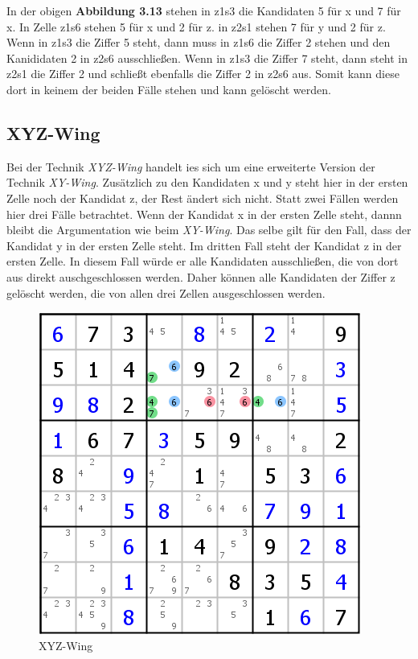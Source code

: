 \documentclass[accentcolor=tud6b,11pt,paper=a4]{tudreport}
\begin{document}
In der obigen \textbf{Abbildung 3.13} stehen in z1s3 die Kandidaten 5 für x und 7 für x. In Zelle z1s6 stehen 5 für x und 2 für z. in z2s1 stehen 7 für y und 2 für z. Wenn in z1s3 die Ziffer 5 steht, dann muss in z1s6 die Ziffer 2 stehen und den Kanididaten 2 in z2s6 ausschließen. Wenn in z1s3 die Ziffer 7 steht, dann steht in z2s1 die Ziffer 2 und schließt ebenfalls die Ziffer 2 in z2s6 aus. Somit kann diese dort in keinem der beiden Fälle stehen und kann gelöscht werden.

\newpage
\subsection{XYZ-Wing}
Bei der Technik \textit{XYZ-Wing} handelt ies sich um eine erweiterte Version der Technik \textit{XY-Wing}. Zusätzlich zu den Kandidaten x und y steht hier in der ersten Zelle noch der Kandidat z, der Rest ändert sich nicht. Statt zwei Fällen werden hier drei Fälle betrachtet. Wenn der Kandidat x in der ersten Zelle steht, dannn bleibt die Argumentation wie beim \textit{XY-Wing}. Das selbe gilt für den Fall, dass der Kandidat y in der ersten Zelle steht. Im dritten Fall steht der Kandidat z in der ersten Zelle. In diesem Fall würde er alle Kandidaten ausschließen, die von dort aus direkt auschgeschlossen werden. Daher können alle Kandidaten der Ziffer z gelöscht werden, die von allen drei Zellen ausgeschlossen werden.

\begin{figure}[h]
\begin{center}
\includegraphics{./img/XYZ_Wing.png}
\caption{XYZ-Wing}
\end{center}
\end{figure}
\end{document}
